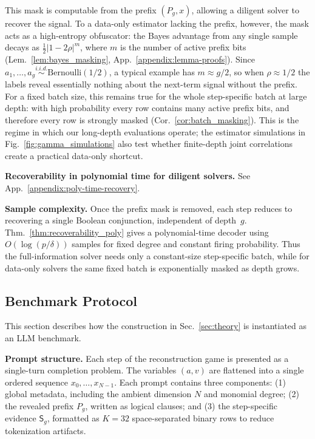 \documentclass{article}
\begin{document}
This mask is computable from the prefix $(P_g, x)$, allowing a diligent solver to recover the signal. To a data-only estimator lacking the prefix, however, the mask acts as a high-entropy obfuscator: the Bayes advantage from any single sample decays as $\tfrac{1}{2}|1-2\rho|^{m}$, where $m$ is the number of active prefix bits (Lem.~\ref{lem:bayes_masking}, App.~\ref{appendix:lemma-proofs}). Since $a_1,\dots,a_g\stackrel{i.i.d.}{\sim}\mathrm{Bernoulli}(1/2)$, a typical example has $m \approx g/2$, so when $\rho\approx 1/2$ the labels reveal essentially nothing about the next-term signal without the prefix. For a fixed batch size, this remains true for the whole step-specific batch at large depth: with high probability every row contains many active prefix bits, and therefore every row is strongly masked (Cor.~\ref{cor:batch_masking}). This is the regime in which our long-depth evaluations operate; the estimator simulations in Fig.~\ref{fig:gamma_simulations} also test whether finite-depth joint correlations create a practical data-only shortcut.

{\bf Recoverability in polynomial time for diligent solvers.\enspace} See App.~\ref{appendix:poly-time-recovery}.

{\bf Sample complexity.\enspace} Once the prefix mask is removed, each step reduces to recovering a single Boolean conjunction, independent of depth~$g$. Thm.~\ref{thm:recoverability_poly} gives a polynomial-time decoder using $O(\log(p/\delta))$ samples for fixed degree and constant firing probability. Thus the full-information solver needs only a constant-size step-specific batch, while for data-only solvers the same fixed batch is exponentially masked as depth grows.

\subsection{Benchmark Protocol}
\label{sec:benchmark}

This section describes how the construction in Sec.~\ref{sec:theory} is instantiated as an LLM benchmark.

{\bf Prompt structure.\enspace} Each step of the reconstruction game is presented as a single-turn completion problem. The variables $(a,v)$ are flattened into a single ordered sequence
$x_0,\dots,x_{N-1}$. Each prompt contains three components:
(1) global metadata, including the ambient dimension $N$ and monomial degree;
(2) the revealed prefix $P_g$, written as logical clauses; and
(3) the step-specific evidence $\mathsf S_g$, formatted as $K=32$ space-separated binary rows to reduce tokenization artifacts.
\end{document}
